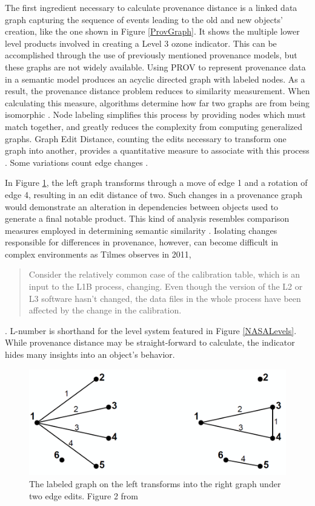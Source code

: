 The first ingredient necessary to calculate provenance distance is a linked data graph capturing the sequence of events leading to the old and new objects' creation, like the one shown in Figure \ref{ProvGraph}.
It shows the multiple lower level products involved in creating a Level 3 ozone indicator.
This can be accomplished through the use of previously mentioned provenance models, but these graphs are not widely available.
Using PROV to represent provenance data in a semantic model produces an acyclic directed graph with labeled nodes.
As a result, the provenance distance problem reduces to similarity measurement.
When calculating this measure, algorithms determine how far two graphs are from being isomorphic \cite{Cao2013}.
Node labeling simplifies this process by providing nodes which must match together, and greatly reduces the complexity from computing generalized graphs.
Graph Edit Distance, counting the edits necessary to transform one graph into another, provides a quantitative measure to associate with this process  \cite{Gao2010}.
Some variations count edge changes \cite{Goddard:1996:DGU:246962.246972}.

In Figure \ref{GraphEdit}, the left graph transforms through a move of edge 1 and a rotation of edge 4, resulting in an edit distance of two.
Such changes in a provenance graph would demonstrate an alteration in dependencies between objects used to generate a final notable product.
This kind of analysis resembles comparison measures employed in determining semantic similarity \cite{Hliaoutakis06informationretrieval}.
Isolating changes responsible for differences in provenance, however, can become difficult in complex environments as Tilmes observes in 2011, 
\begin{quotation}
	Consider the relatively common case of the calibration table, which is an input to the L1B process, changing. Even though the version of the L2 or L3 software hasn't changed, the data files in the whole process have been affected by the change in the calibration.
\end{quotation} \cite{TILMES2011548}.
L-number is shorthand for the level system featured in Figure \ref{NASALevels}.
While provenance distance may be straight-forward to calculate, the indicator hides many insights into an object's behavior.

\begin{figure}
	\centering
	\includegraphics[scale=0.40]{figures/GraphEdit.png}
	\caption[The labeled graph on the left transforms into the right graph under two edge edits.]{The labeled graph on the left transforms into the right graph under two edge edits. Figure 2 from \cite{Goddard:1996:DGU:246962.246972}}
	\label{GraphEdit}
\end{figure}

